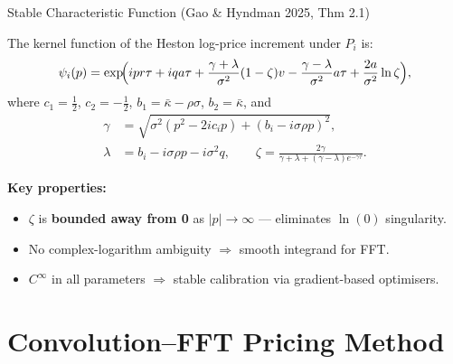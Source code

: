 \documentclass[10pt, aspectratio=169]{beamer}
\begin{document}
\begin{frame}{Stable Characteristic Function (Gao \& Hyndman 2025, Thm 2.1)}
\begin{theorem}
The kernel function of the Heston log-price increment under $P_i$ is:
\begin{equation}\label{eq:stable_cf}
  \psi_i(p) = \exp\!\Bigl(ipr\tau + iqa\tau + \frac{\gamma + \lambda}{\sigma^2}(1-\zeta)v - \frac{\gamma-\lambda}{\sigma^2}a\tau + \frac{2a}{\sigma^2}\ln\zeta\Bigr),
\end{equation}
where $c_1 = \tfrac{1}{2}$, $c_2 = -\tfrac{1}{2}$, $b_1 = \bar\kappa - \rho\sigma$, $b_2 = \bar\kappa$, and
\begin{align}
  \gamma &= \sqrt{\sigma^2(p^2 - 2ic_ip) + (b_i - i\sigma\rho p)^2}, \label{eq:gamma}\\
  \lambda &= b_i - i\sigma\rho p - i\sigma^2 q, \qquad
  \zeta = \frac{2\gamma}{\gamma + \lambda + (\gamma-\lambda)e^{-\gamma\tau}}. \label{eq:zeta}
\end{align}
\end{theorem}
\vspace{-2pt}
\textbf{Key properties:}
\begin{itemize}\setlength\itemsep{1pt}
  \item $\zeta$ is \textbf{bounded away from 0} as $|p|\to\infty$ --- eliminates $\ln(0)$ singularity.
  \item No complex-logarithm ambiguity $\Rightarrow$ smooth integrand for FFT.
  \item $C^\infty$ in all parameters $\Rightarrow$ stable calibration via gradient-based optimisers.
\end{itemize}
\end{frame}

\section{Convolution--FFT Pricing Method}
\end{document}
